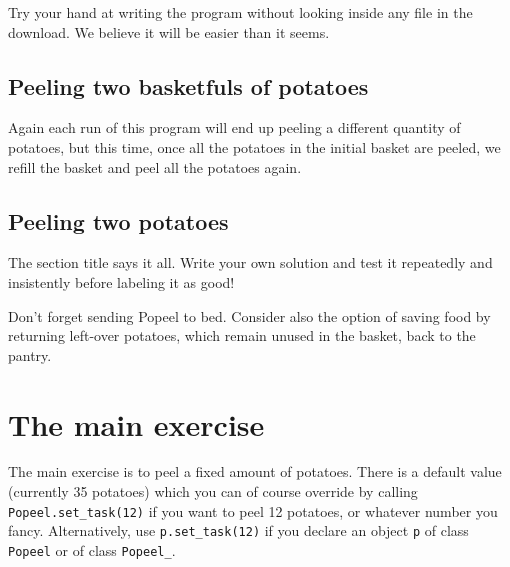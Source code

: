 \documentclass[12pt]{article}
\begin{document}
Try your hand at writing the program without looking
inside any file in the download. We believe it will 
be easier than it seems.

\subsection{Peeling two basketfuls of potatoes}

Again each run of this program will end up peeling a 
different quantity of potatoes, but this time, once
all the potatoes in the initial basket are peeled,
we refill the basket and peel all the potatoes again.



\subsection{Peeling two potatoes}

The section title says it all. 
Write your own solution and test it
repeatedly and insistently before labeling it
as good! 

Don't forget sending Popeel to bed.
Consider also the option of saving food by
returning left-over potatoes, which remain
unused in the basket, back to the pantry.

\section{The main exercise}

The main exercise is to peel a fixed amount of potatoes.
There is a default value (currently 35 potatoes) 
which you can of course override by
calling {\tt Popeel.set_task(12)} if you want 
to peel 12 potatoes, or whatever number you fancy. 
Alternatively, use {\tt p.set_task(12)} if
you declare an object {\tt p} of class {\tt Popeel}
or of class {\tt Popeel_}.
\end{document}
